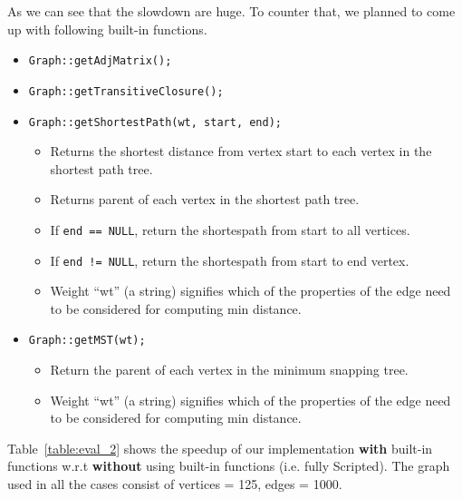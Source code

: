 As we can see that the slowdown are huge. To counter that, we planned to come up 
with following built-in functions.
  \begin{itemize}
    \item { \tt Graph::getAdjMatrix();}
    \item {\tt Graph::getTransitiveClosure();}
    \item {\tt Graph::getShortestPath(wt, start, end);}
    \begin{itemize}
      \item Returns the shortest distance from vertex start to each vertex in the 
      shortest path tree.
      \item Returns parent of each vertex in the shortest path tree.
      \item If {\tt end == NULL}, return the shortespath from start to all vertices.
      \item If {\tt end != NULL}, return the shortespath from start to end vertex.
      \item Weight ``wt'' (a string) signifies which of the properties of the
edge need to be considered for computing min distance.
    \end{itemize} 
    \item {\tt Graph::getMST(wt);}
    \begin{itemize}
      \item Return the parent of each vertex in the minimum snapping tree.
      \item Weight ``wt'' (a string) signifies which of the properties of the
edge need to be considered for computing min distance.
    \end{itemize} 
  \end{itemize}


  Table~\ref{table:eval_2} shows the speedup of our implementation \textbf{with} built-in 
  functions w.r.t  \textbf{without} using built-in functions (i.e. fully 
      Scripted). The graph used in 
  all the cases consist of vertices = 125, edges = 1000.

